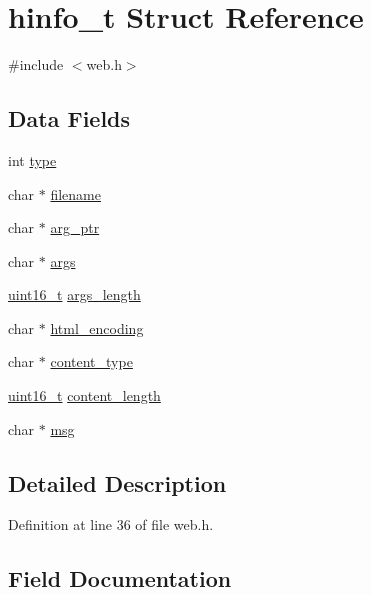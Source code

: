 \hypertarget{structhinfo__t}{}\section{hinfo\+\_\+t Struct Reference}
\label{structhinfo__t}


{\ttfamily \#include $<$web.\+h$>$}

\subsection*{Data Fields}
\begin{DoxyCompactItemize}
\item 
int \hyperlink{structhinfo__t_a4e896141431943909a71282fc56799fb}{type}
\item 
char $\ast$ \hyperlink{structhinfo__t_a874ffdf5ade4e3844d7719444495e89c}{filename}
\item 
char $\ast$ \hyperlink{structhinfo__t_a0d27c1b7d2730373f93342961b9cb18d}{arg\+\_\+ptr}
\item 
char $\ast$ \hyperlink{structhinfo__t_a62bf198b939a9d932bcac763ebc51443}{args}
\item 
\hyperlink{send_8c_a273cf69d639a59973b6019625df33e30}{uint16\+\_\+t} \hyperlink{structhinfo__t_a003130c9489dfe54a76df23a85fae62f}{args\+\_\+length}
\item 
char $\ast$ \hyperlink{structhinfo__t_ac03bcdde52e49a14bf9112f295f216b5}{html\+\_\+encoding}
\item 
char $\ast$ \hyperlink{structhinfo__t_a87bad5ce6af7ed3613a61d01aef94d8d}{content\+\_\+type}
\item 
\hyperlink{send_8c_a273cf69d639a59973b6019625df33e30}{uint16\+\_\+t} \hyperlink{structhinfo__t_a6cf5714c0fe8e8e7f7819194274f9052}{content\+\_\+length}
\item 
char $\ast$ \hyperlink{structhinfo__t_a06469570091ad74724457998e07d5b56}{msg}
\end{DoxyCompactItemize}


\subsection{Detailed Description}


Definition at line 36 of file web.\+h.



\subsection{Field Documentation}
